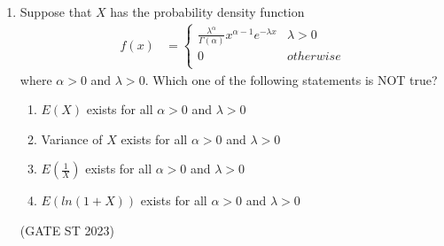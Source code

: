 \begin{enumerate}[label=\thechapter.\arabic*,ref=\thechapter.\theenumi]
\item Suppose that $X$ has the probability density function
\begin{align}
f(x)&=
\begin{cases}
\frac{\lambda^{\alpha}}{\Gamma(\alpha)}x^{\alpha - 1} e^{-\lambda x} & \lambda > 0\\
0 & otherwise\\
\end{cases}
\end{align}
where $\alpha > 0$ and $\lambda > 0$. Which one of the following statements is NOT true?
\begin{enumerate}
\item $E(X)$ exists for all $\alpha > 0 $ and $ \lambda > 0$
\item Variance of $X$ exists for all $\alpha > 0$ and $\lambda > 0$
\item $E(\frac{1}{X})$ exists for all $\alpha > 0$ and $\lambda > 0$
\item $E(ln(1+X))$ exists for all $\alpha > 0$ and $\lambda > 0$
\end{enumerate}
\hfill (GATE ST 2023)
\\
\solution\\

\end{enumerate}
